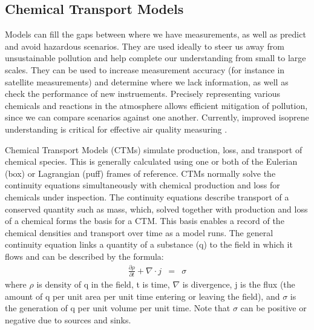   \subsection{Chemical Transport Models}
    
    Models can fill the gaps between where we have measurements, as well as predict and avoid hazardous scenarios.
    They are used ideally to steer us away from unsustainable pollution and help complete our understanding from small to large scales.
    They can be used to increase measurement accuracy (for instance in satellite measurements) and determine where we lack information, as well as check the performance of new instruements.
    Precisely representing various chemicals and reactions in the atmosphere allows efficient mitigation of pollution, since we can compare scenarios against one another.
    Currently, improved isoprene understanding is critical for effective air quality measuring \citep{Marvin2017}.
    
    Chemical Transport Models (CTMs) simulate production, loss, and transport of chemical species.
    This is generally calculated using one or both of the Eulerian (box) or Lagrangian (puff) frames of reference.
    CTMs normally solve the continuity equations simultaneously with chemical production and loss for chemicals under inspection. 
    The continuity equations describe transport of a conserved quantity such as mass, which, solved together with production and loss of a chemical forms the basis for a CTM.
    This basis enables a record of the chemical densities and transport over time as a model runs.
    The general continuity equation links a quantity of a substance (q) to the field in which it flows and can be described by the formula:
    \begin{eqnarray*}
	\frac{\partial \rho}{\partial t} + \nabla \cdot j &=& \sigma 
    \end{eqnarray*}
    where $\rho$ is density of q in the field, t is time, $\nabla$ is divergence, j is the flux (the amount of q per unit area per unit time entering or leaving the field), and $\sigma$ is the generation of q per unit volume per unit time.
    Note that $\sigma$ can be positive or negative due to sources and sinks.

